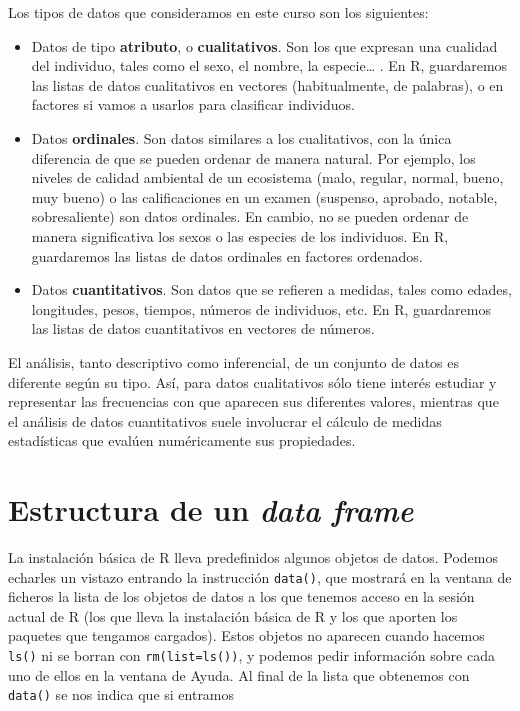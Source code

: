 \documentclass[]{book}
\theoremstyle{definition}
\theoremstyle{definition}
\theoremstyle{definition}
\theoremstyle{remark}
\begin{document}
Los tipos de datos que consideramos en este curso son los siguientes:

\begin{itemize}
\item
  Datos de tipo \textbf{atributo}, o \textbf{cualitativos}. Son los que expresan una cualidad del individuo, tales como el sexo, el nombre, la especie\ldots{} . En R, guardaremos las listas de datos cualitativos en vectores (habitualmente, de palabras), o en factores si vamos a usarlos para clasificar individuos.
\item
  Datos \textbf{ordinales}. Son datos similares a los cualitativos, con la única diferencia de que se pueden ordenar de manera natural. Por ejemplo, los niveles de calidad ambiental de un ecosistema (malo, regular, normal, bueno, muy bueno) o las calificaciones en un examen (suspenso, aprobado, notable, sobresaliente) son datos ordinales. En cambio, no se pueden ordenar de manera significativa los sexos o las especies de los individuos. En R, guardaremos las listas de datos ordinales en factores ordenados.
\item
  Datos \textbf{cuantitativos}. Son datos que se refieren a medidas, tales como edades, longitudes, pesos, tiempos, números de individuos, etc. En R, guardaremos las listas de datos cuantitativos en vectores de números.
\end{itemize}

El análisis, tanto descriptivo como inferencial, de un conjunto de datos es
diferente según su tipo. Así, para datos cualitativos sólo tiene interés estudiar y representar las frecuencias con que aparecen sus diferentes valores, mientras que el análisis de datos cuantitativos suele involucrar el cálculo de medidas estadísticas que evalúen numéricamente sus propiedades.

\hypertarget{estructura-de-un-data-frame}{%
\section{\texorpdfstring{Estructura de un \emph{data frame}}{Estructura de un data frame}}\label{estructura-de-un-data-frame}}

La instalación básica de R lleva predefinidos algunos objetos de datos.
Podemos echarles un vistazo entrando la instrucción \texttt{data()}, que mostrará en la ventana de ficheros la lista de los objetos de datos a los que tenemos acceso en la sesión actual de R (los que lleva la instalación básica de R y los que aporten los paquetes que tengamos cargados). Estos objetos no aparecen cuando hacemos \texttt{ls()} ni se borran con \texttt{rm(list=ls())}, y podemos pedir información sobre cada uno de ellos en la ventana de Ayuda. Al final de la lista que obtenemos con \texttt{data()} se nos indica que si entramos
\end{document}
